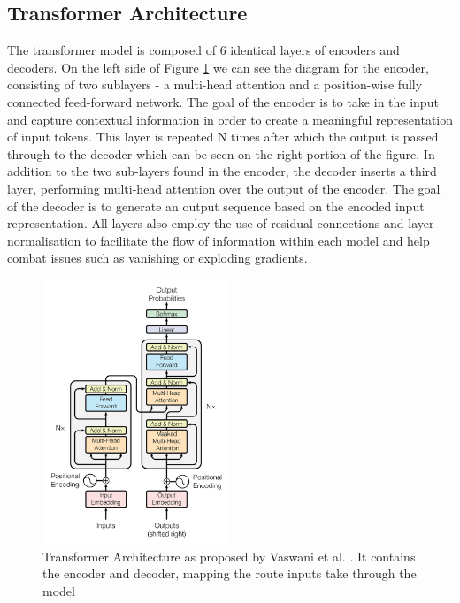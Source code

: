 \subsection{Transformer Architecture}

The transformer model is composed of 6 identical layers of encoders and decoders. On the left side of Figure \ref{fig:transformer_arch} we can see the diagram for the encoder, consisting of two sublayers - a multi-head attention and a position-wise fully connected feed-forward network. The goal of the encoder is to take in the input and capture contextual information in order to create a meaningful representation of input tokens. This layer is repeated N times after which the output is passed through to the decoder which can be seen on the right portion of the figure. In addition to the two sub-layers found in the encoder, the decoder inserts a third layer, performing multi-head attention over the output of the encoder. The goal of the decoder is to generate an output sequence based on the encoded input representation. All layers also employ the use of residual connections and layer normalisation to facilitate the flow of information within each model and help combat issues such as vanishing or exploding gradients.

\begin{figure}[H]
    \centering
    \includegraphics[width=0.5\textwidth]{graphs/transformer_architecture.png}
    \caption{Transformer Architecture as proposed by Vaswani et al. \cite{transformer_paper}. It contains the encoder and decoder, mapping the route inputs take through the model}
    \label{fig:transformer_arch}
\end{figure}

